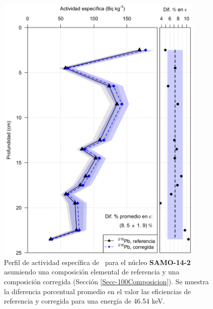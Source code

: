 \begin{figure}
\centering
\includegraphics[width=0.9\textwidth]{Imagenes/Act_210Pb_Agua_Composicion_SAMO-14-2.png}
\caption{Perfil de actividad específica de \PbCero\, para el núcleo \textbf{SAMO-14-2} asumiendo una composición elemental de referencia y una composición corregida (Sección \ref{Secc-100Composicion}). Se muestra la diferencia porcentual promedio en el valor las eficiencias de referencia y corregida para una energía de 46.54 keV.}\label{FigSAMO142Agua}
\end{figure}

